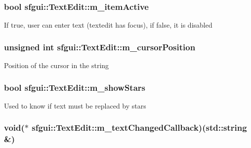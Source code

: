 \hypertarget{classsfgui_1_1TextEdit_8ffa5546b2fd4901837b13a118f9beef}{
\subsubsection[m\_\-itemActive]{\setlength{\rightskip}{0pt plus 5cm}bool {\bf sfgui::TextEdit::m\_\-itemActive}}}
\label{classsfgui_1_1TextEdit_8ffa5546b2fd4901837b13a118f9beef}


If true, user can enter text (textedit has focus), if false, it is disabled \hypertarget{classsfgui_1_1TextEdit_9392f92ba9efe59f56801ec3c0e52ccb}{
\subsubsection[m\_\-cursorPosition]{\setlength{\rightskip}{0pt plus 5cm}unsigned int {\bf sfgui::TextEdit::m\_\-cursorPosition}}}
\label{classsfgui_1_1TextEdit_9392f92ba9efe59f56801ec3c0e52ccb}


Position of the cursor in the string \hypertarget{classsfgui_1_1TextEdit_c4a8a483ad2fcdaa9201489665774e19}{
\subsubsection[m\_\-showStars]{\setlength{\rightskip}{0pt plus 5cm}bool {\bf sfgui::TextEdit::m\_\-showStars}}}
\label{classsfgui_1_1TextEdit_c4a8a483ad2fcdaa9201489665774e19}


Used to know if text must be replaced by stars \hypertarget{classsfgui_1_1TextEdit_a6d415ef1daf7f9fdf0dec3d71cb8eab}{
\subsubsection[m\_\-textChangedCallback]{\setlength{\rightskip}{0pt plus 5cm}void($\ast$ {\bf sfgui::TextEdit::m\_\-textChangedCallback})(std::string \&)}}
\label{classsfgui_1_1TextEdit_a6d415ef1daf7f9fdf0dec3d71cb8eab}


